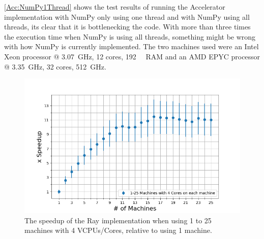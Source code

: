\documentclass[12pt, a4paper]{article}
\begin{document}
\cref{Acc:NumPy1Thread} shows the test results of running the Accelerator implementation with NumPy only using one thread and with NumPy using all threads, its clear that it is bottlenecking the code.
With more than three times the execution time when NumPy is using all threads, something might be wrong with how NumPy is currently implemented.
The two machines used were an Intel Xeon processor @ \SI{3.07}{\giga\hertz}, 12 cores, \SI{192}{\giga\byte} RAM and an AMD EPYC processor @ \SI{3.35}{\giga\hertz}, 32 cores, \SI{512}{\giga\hertz}.

\begin{figure}[H]
    \centering
    \includegraphics[width=1.0\textwidth, ]{pictures/MachinesXSpeedupWhite.png}
    \caption{The speedup of the Ray implementation when using 1 to 25 machines with 4 VCPUs/Cores, relative to using 1 machine.}
    \label{fig:MachineXSpeedup}
\end{figure}
\end{document}
